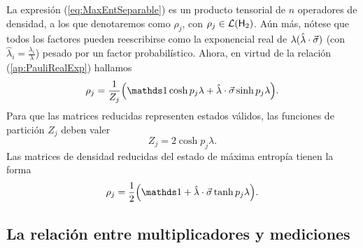 
La expresión (\ref{eq:MaxEntSeparable}) es un producto tensorial de $n$ operadores de densidad, a los que denotaremos como $\rho_{j}$, con $\rho_{j}\in\mathcal{L}({\sf H}_{2})$. Aún más, nótese que todos los factores pueden reescribirse como la exponencial real de $\lambda(\hat{\lambda}\cdot\vec{\sigma})$ (con $\hat{\lambda}_{i}=\frac{\lambda_{i}}{\lambda}$) pesado por un factor probabilístico. Ahora, en virtud de la relación (\ref{ap:PauliRealExp}) hallamos
\begin{equation}
    \rho_{j}=\frac{1}{Z_{j}}\qty(\Id\cosh{p_{j}\lambda}+\paulivec{\lambda}\sinh{p_{j}\lambda}).\nonumber
\end{equation}
Para que las matrices reducidas representen estados válidos, las funciones de partición $Z_{j}$ deben valer
\begin{equation}
    Z_{j}=2\cosh{p_{j}\lambda}.\nonumber
\end{equation}
Las matrices de densidad reducidas del estado de máxima entropía tienen la forma
\begin{equation}\label{eq:rhoArhoB}
    \rho_{j}=\frac{1}{2}\qty(\Id+\paulivec{\lambda}\tanh{p_{j}\lambda}).
\end{equation}

\subsection{La relación entre multiplicadores y mediciones}



